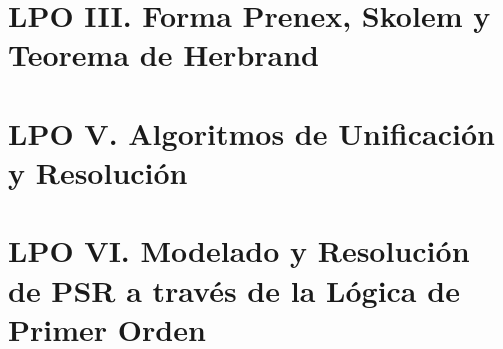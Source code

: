 \documentclass[a4paper]{report}
\begin{document}
\chapter{LPO III. Forma Prenex, Skolem y Teorema de Herbrand}
\renewcommand{\mtctitle}{}
\mtcskip
\minitoc
\newpage
\chapter{LPO V. Algoritmos de Unificación y Resolución}
\renewcommand{\mtctitle}{}
\mtcskip
\minitoc
\newpage
\chapter{LPO VI. Modelado y Resolución de PSR a través de la Lógica de Primer Orden}
\renewcommand{\mtctitle}{}
\mtcskip
\minitoc
\newpage
\end{document}

